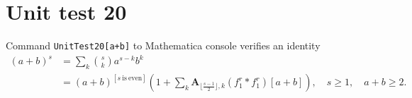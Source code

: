 \documentclass[12pt, letterpaper]{amsart}
\theoremstyle{definition}
\theoremstyle{remark}
\numberwithin{equation}{section}
\begin{document}
\section*{Unit test 20}
Command \verb"UnitTest20[a+b]" to Mathematica console verifies an identity
\begin{equation*}
\begin{split}
(a+b)^s 
&=\sum_{k} \binom{s}{k} a^{s-k} b^k \\
&=(a+b)^{[s \ \mathrm{is} \ \mathrm{even}]} \left(1 + \sum_{k}^{ \ }\mathbf{A}_{\lfloor \tfrac{s-1}{2} \rfloor, k}(f^{r}_{1} \ast f^{r}_{1})[a+b]\right), \quad s\geq 1, \quad a+b\geq 2.
\end{split}
\end{equation*}
\end{document}
